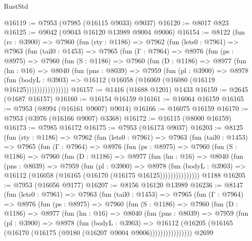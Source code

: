\begin{lexlean}{RustStd}
\begin{coremodule}
@16119 := @7953 (@7985 (@16115 @9033) @9037)
@16120 := @8017 @823
@16125 := @9042 (@9043 @16120 @13989 @9004 @9006)
@16154 := @8122
    (fun (rc : @3900) =>
    @7960
      (fun (rty : @1186) =>
      @7962
        (fun (lets0 : @7961) =>
        @7963
          (fun (tail0 : @1453) =>
          @7965
            (fun (Γ : @7964) =>
            @8976
              (fun (ps : @8975) =>
              @7960
                (fun (S : @1186) =>
                @7960
                  (fun (D : @1186) =>
                  @8977
                    (fun (hn : @16) =>
                    @8040
                      (fun (pns : @8039) =>
                      @7959
                        (fun (pl : @3900) =>
                        @8978
                          (fun (bodyL : @3903) =>
                          @16112 (@16058 (@16069 (@16080 (@16119 @16125))))))))))))))))
@16157 := @1416 (@1688 @1201) @1433
@16159 := @2645 (@1687 @16157)
@16160 := @16154 @16159
@16161 := @16064 @16159
@16165 := @7953 (@8994 (@16161 @9007) @9014)
@16166 := @16075 @16159
@16170 := @7953 (@3976 (@16166 @9007) @3368)
@16172 := @16115 (@8000 @16159)
@16173 := @7985 @16172
@16175 := @7953 (@16173 @9037)
@16203 := @8125
    (fun (rty : @1186) =>
    @7962
      (fun (lets0 : @7961) =>
      @7963
        (fun (tail0 : @1453) =>
        @7965
          (fun (Γ : @7964) =>
          @8976
            (fun (ps : @8975) =>
            @7960
              (fun (S : @1186) =>
              @7960
                (fun (D : @1186) =>
                @8977
                  (fun (hn : @16) =>
                  @8040
                    (fun (pns : @8039) =>
                    @7959
                      (fun (pl : @3900) =>
                      @8978
                        (fun (bodyL : @3903) =>
                        @16112 (@16058 (@16165 (@16170 (@16175 @16125)))))))))))))))
    @1188
@16205 := @7953 (@16056 @9177)
@16207 := @8156 @16120 @13989
@16236 := @8147
    (fun (lets0 : @7961) =>
    @7963
      (fun (tail0 : @1453) =>
      @7965
        (fun (Γ : @7964) =>
        @8976
          (fun (ps : @8975) =>
          @7960
            (fun (S : @1186) =>
            @7960
              (fun (D : @1186) =>
              @8977
                (fun (hn : @16) =>
                @8040
                  (fun (pns : @8039) =>
                  @7959
                    (fun (pl : @3900) =>
                    @8978
                      (fun (bodyL : @3903) =>
                      @16112
                        (@16205 (@16165 (@16170 (@16175 (@9180 (@16207 @9004 @9006))))))))))))))))
    @2699

\end{coremodule}
\end{lexlean}
